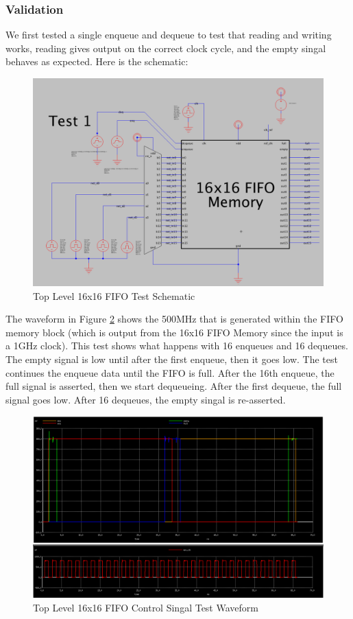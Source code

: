 \documentclass[a4paper]{article}
\begin{document}
\subsubsection{Validation}

We first tested a single enqueue and dequeue to test that reading and writing works, reading gives output on the correct clock cycle, and the empty singal behaves as expected. Here is the schematic:

\begin{figure}[H]
	\centering
	\includegraphics[scale=0.25]{topLevelTestSchematic}
	\caption{Top Level 16x16 FIFO Test Schematic}
	\label{fig:topLevelTestSchematic}
\end{figure}

The waveform in Figure \ref{fig:topLevelTestControlWaveform} shows the 500MHz that is generated within the FIFO memory block (which is output from the 16x16 FIFO Memory since the input is a 1GHz clock). This test shows what happens with 16 enqueues and 16 dequeues. The empty signal is low until after the first enqueue, then it goes low. The test continues the enqueue data until the FIFO is full. After the 16th enqueue, the full signal is asserted, then we start dequeueing. After the first dequeue, the full signal goes low. After 16 dequeues, the empty singal is re-asserted. 

\begin{figure}[H]
	\centering
	\includegraphics[scale=0.25]{topLevelTestControlWaveform}
	\caption{Top Level 16x16 FIFO Control Singal Test Waveform}
	\label{fig:topLevelTestControlWaveform}
\end{figure}
\end{document}
